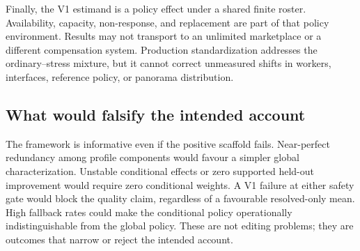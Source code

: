 Finally, the V1 estimand is a policy effect under a shared finite roster. Availability, capacity, non-response, and replacement are part of that policy environment. Results may not transport to an unlimited marketplace or a different compensation system. Production standardization addresses the ordinary--stress mixture, but it cannot correct unmeasured shifts in workers, interfaces, reference policy, or panorama distribution.

\subsection{What would falsify the intended account}

The framework is informative even if the positive scaffold fails. Near-perfect redundancy among profile components would favour a simpler global characterization. Unstable conditional effects or zero supported held-out improvement would require zero conditional weights. A V1 failure at either safety gate would block the quality claim, regardless of a favourable resolved-only mean. High fallback rates could make the conditional policy operationally indistinguishable from the global policy. These are not editing problems; they are outcomes that narrow or reject the intended account.
